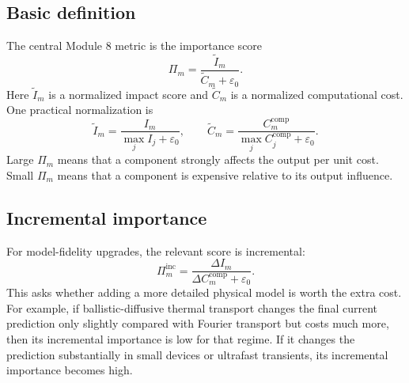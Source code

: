 \documentclass[11pt]{article}
\begin{document}
\subsection{Basic definition}
The central Module 8 metric is the importance score
\begin{equation}
    \boxed{
    \Pi_m
    =
    \frac{\widetilde{I}_m}{\widetilde{C}_m+\varepsilon_0}.
    }
    \label{eq:importance_score}
\end{equation}
Here \(\widetilde{I}_m\) is a normalized impact score and \(\widetilde{C}_m\) is a normalized computational cost. One practical normalization is
\begin{equation}
    \widetilde{I}_m
    =
    \frac{I_m}{\max_j I_j+\varepsilon_0},
    \qquad
    \widetilde{C}_m
    =
    \frac{C_m^{\mathrm{comp}}}{\max_j C_j^{\mathrm{comp}}+\varepsilon_0}.
    \label{eq:normalized_impact_cost}
\end{equation}
Large \(\Pi_m\) means that a component strongly affects the output per unit cost. Small \(\Pi_m\) means that a component is expensive relative to its output influence.

\subsection{Incremental importance}
For model-fidelity upgrades, the relevant score is incremental:
\begin{equation}
    \boxed{
    \Pi_m^{\mathrm{inc}}
    =
    \frac{\Delta I_m}{\Delta C_m^{\mathrm{comp}}+\varepsilon_0}.
    }
    \label{eq:incremental_importance}
\end{equation}
This asks whether adding a more detailed physical model is worth the extra cost. For example, if ballistic-diffusive thermal transport changes the final current prediction only slightly compared with Fourier transport but costs much more, then its incremental importance is low for that regime. If it changes the prediction substantially in small devices or ultrafast transients, its incremental importance becomes high.
\end{document}

